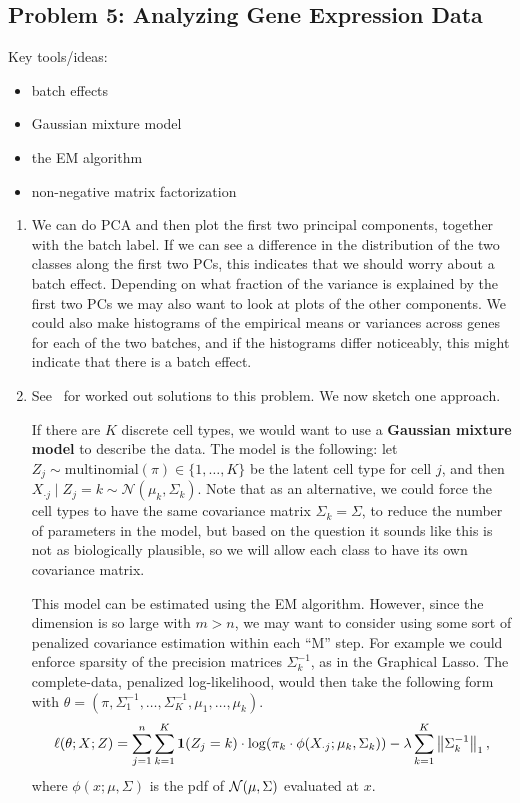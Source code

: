 \subsection*{Problem 5: Analyzing Gene Expression Data}
Key tools/ideas:
\begin{itemize}
  \item batch effects
  \item Gaussian mixture model
  \item the EM algorithm
  \item non-negative matrix factorization
\end{itemize}

\begin{enumerate}[label=(\alph*)]
\item
  We can do PCA and then plot the first two principal components, together with the batch label. If we can see a difference in the distribution of the two classes along the first two PCs, this indicates that we should worry about a batch effect. Depending on what fraction of the variance is explained by the first two PCs we may also want to look at plots of the other components. We could also make histograms of the empirical means or variances across genes for each of the two batches, and if the histograms differ noticeably, this might indicate that there is a batch effect.

\item See~\citet*{gao2016estimation, hao2017simultaneous} for worked out solutions to this problem. We now sketch one approach.

  If there are $K$ discrete cell types, we would want to use a {\bf Gaussian mixture model} to describe the data. The model is the following: let $Z_j \sim \text{multinomial}(\pi) \in \{1,\dots,K\}$ be the latent cell type for cell $j$, and then $X_{\cdot j} \mid Z_j = k \sim \mathcal{N}(\mu_k, \Sigma_k)$. Note that as an alternative, we could force the cell types to have the same covariance matrix $\Sigma_k = \Sigma$, to reduce the number of parameters in the model, but based on the question it sounds like this is not as biologically plausible, so we will allow each class to have its own covariance matrix.

  This model can be estimated using the EM algorithm. However, since the dimension is so large with $m > n$, we may want to consider using some sort of penalized covariance estimation within each ``M'' step. For example we could enforce sparsity of the precision matrices $\Sigma_k^{-1}$, as in the Graphical Lasso. The complete-data, penalized log-likelihood, would then take the following form with $\theta = (\pi,\Sigma_1^{-1},\dotsc,\Sigma_K^{-1}, \mu_1,\dotsc,\mu_k)$. 
  $$\ell(\theta; X; Z) = \sum_{j=1}^n \sum_{k=1}^K \mathbf{1}(Z_j = k) \cdot \log(\pi_k \cdot \phi(X_{\cdot j}; \mu_k, \Sigma_k))    - \lambda \sum_{k=1}^K  \left\lVert\Sigma_k^{-1}\right\rVert_1,$$
  where $\phi(x; \mu, \Sigma)$ is the pdf of $\mathcal{N}(\mu, \Sigma)$ evaluated at $x$.\\
  

\end{enumerate}
